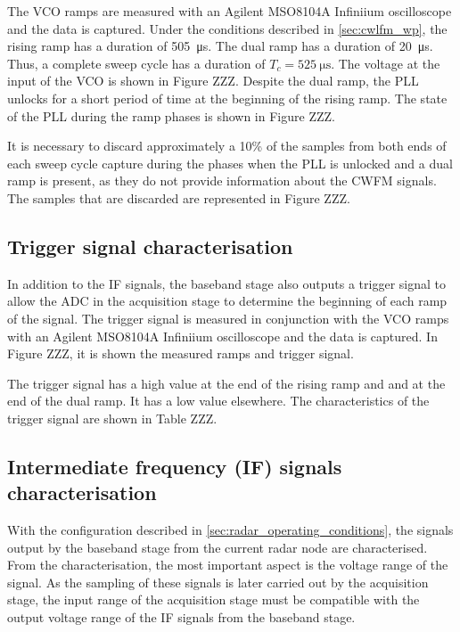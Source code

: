 The VCO ramps are measured with an Agilent MSO8104A Infiniium oscilloscope and the data is captured. Under the conditions described in \cref{sec:cwlfm_wp}, the rising ramp has a duration of \SI{505}{\micro\second}. The dual ramp has a duration of \SI{20}{\micro\second}. Thus, a complete sweep cycle has a duration of $T_c = \SI{525}{\micro\second}$. The voltage at the input of the VCO is shown in Figure ZZZ. Despite the dual ramp, the PLL unlocks for a short period of time at the beginning of the rising ramp. The state of the PLL during the ramp phases is shown in Figure ZZZ.

It is necessary to discard approximately a 10\% of the samples from both ends of each sweep cycle capture during the phases when the PLL is unlocked and a dual ramp is present, as they do not provide information about the CWFM signals. The samples that are discarded are represented in Figure ZZZ.

\subsection{Trigger signal characterisation} \label{sec:trigger_signal_characterisation}

In addition to the IF signals, the baseband stage also outputs a trigger signal to allow the ADC in the acquisition stage to determine the beginning of each ramp of the signal. The trigger signal is measured in conjunction with the VCO ramps with an Agilent MSO8104A Infiniium oscilloscope and the data is captured. In Figure ZZZ, it is shown the measured ramps and trigger signal.

The trigger signal has a high value at the end of the rising ramp and and at the end of the dual ramp. It has a low value elsewhere. The characteristics of the trigger signal are shown in Table ZZZ.

\subsection{Intermediate frequency (IF) signals characterisation} \label{sec:if_signals_characterisation}

With the configuration described in \cref{sec:radar_operating_conditions}, the signals output by the baseband stage from the current radar node are characterised. From the characterisation, the most important aspect is the voltage range of the signal. As the sampling of these signals is later carried out by the acquisition stage, the input range of the acquisition stage must be compatible with the output voltage range of the IF signals from the baseband stage.

